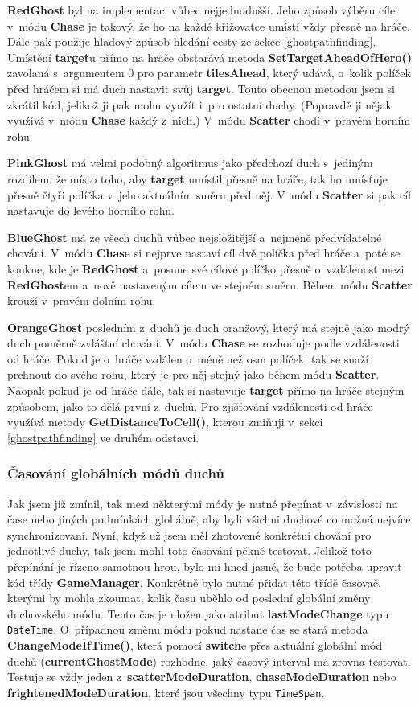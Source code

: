 \documentclass{article}
\begin{document}
\textbf{RedGhost} byl na implementaci vůbec nejjednodušší. Jeho způsob výběru cíle v~módu \textbf{Chase} je takový, že ho na každé křižovatce umístí vždy přesně na hráče. Dále pak použije hladový způsob hledání cesty ze sekce \ref{ghostpathfinding}. Umístění \textbf{target}u přímo na hráče obstarává metoda \textbf{SetTargetAheadOfHero()} zavolaná s~argumentem 0 pro parametr \textbf{tilesAhead}, který udává, o~kolik políček před hráčem si má duch nastavit svůj \textbf{target}. Touto obecnou metodou jsem si zkrátil kód, jelikož ji pak mohu využít i~pro ostatní duchy. (Popravdě ji nějak využívá v~módu \textbf{Chase} každý z~nich.) V~módu \textbf{Scatter} chodí v~pravém horním rohu.

\textbf{PinkGhost} má velmi podobný algoritmus jako předchozí duch s~jediným rozdílem, že místo toho, aby \textbf{target} umístil přesně na hráče, tak ho umísťuje přesně čtyři políčka v~jeho aktuálním směru před něj. V~módu \textbf{Scatter} si pak cíl nastavuje do levého horního rohu.

\textbf{BlueGhost} má ze všech duchů vůbec nejsložitější a~nejméně předvídatelné chování. V~módu \textbf{Chase} si nejprve nastaví cíl dvě políčka před hráče a~poté se koukne, kde je \textbf{RedGhost} a~posune své cílové políčko přesně o~vzdálenost mezi \textbf{RedGhost}em a~nově nastaveným cílem ve stejném směru. Během módu \textbf{Scatter} krouží v~pravém dolním rohu.

\textbf{OrangeGhost} posledním z~duchů je duch oranžový, který má stejně jako modrý duch poměrně zvláštní chování. V~módu \textbf{Chase} se rozhoduje podle vzdálenosti od hráče. Pokud je o~hráče vzdálen o~méně než osm políček, tak se snaží prchnout do svého rohu, který je pro něj stejný jako během módu \textbf{Scatter}. Naopak pokud je od hráče dále, tak si nastavuje \textbf{target} přímo na hráče stejným způsobem, jako to dělá první z~duchů. Pro zjišťování vzdálenosti od hráče využívá metody \textbf{GetDistanceToCell()}, kterou zmiňuji v~sekci \ref{ghostpathfinding} ve druhém odstavci.

\subsubsection{Časování globálních módů duchů} \label{globalmodetiming}
Jak jsem již zmínil, tak mezi některými módy je nutné přepínat v~závislosti na čase nebo jiných podmínkách globálně, aby byli všichni duchové co možná nejvíce synchronizovaní. Nyní, když už jsem měl zhotovené konkrétní chování pro jednotlivé duchy, tak jsem mohl toto časování pěkně testovat. Jelikož toto přepínání je řízeno samotnou hrou, bylo mi hned jasné, že bude potřeba upravit kód třídy \textbf{GameManager}. Konkrétně bylo nutné přidat této třídě časovač, kterými by mohla zkoumat, kolik času uběhlo od poslední globální změny duchovského módu. Tento čas je uložen jako atribut \textbf{lastModeChange} typu \verb|DateTime|. O~případnou změnu módu pokud nastane čas se stará metoda \textbf{ChangeModeIfTime()}, která pomocí \textbf{switch}e přes aktuální globální mód duchů (\textbf{currentGhostMode}) rozhodne, jaký časový interval má zrovna testovat. Testuje se vždy jeden z~\textbf{scatterModeDuration}, \textbf{chaseModeDuration} nebo \textbf{frightenedModeDuration}, které jsou všechny typu \verb|TimeSpan|. 
\end{document}

